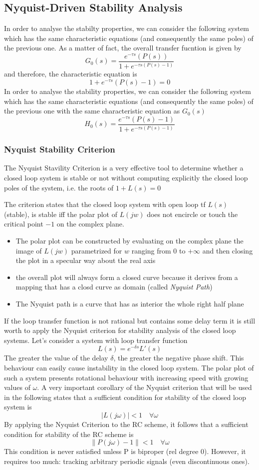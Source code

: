 \documentclass{book}
\begin{document}
\subsection{Nyquist-Driven Stability Analysis}
In order to analyse the stabilty properties, we can consider the following system which has the same characteristic equations (and consequently the same poles) of the previous one. As a matter of fact, the overall transfer fucntion is given by 
\[
    G_0(s) = \displaystyle\frac{e^{-\tau s}(P(s)) }{1+e^{-\tau s(P(s)-1)}}
\]
and therefore, the characteristic equation is 
\[
    1+e^{-\tau s}(P(s)-1)=0
\]
In order to analyse the stability properties, we can consider the following system which has the same characteristic equations (and consequently the same poles) of the previous one
with the same characteristic equation as $G_0(s)$ 
\[
    H_0(s) = \displaystyle\frac{e^{-\tau s}(P(s)-1) }{1+e^{-\tau s(P(s)-1)}}
\]
\subsubsection{Nyquist Stability Criterion} 
The Nyquist Stavility Criterion is a very effective tool to determine whether a closed loop system is stable or not without computing explicitly the closed loop poles of the system, i.e. the roots of $1+L(s)=0$

The criterion states that the closed loop system with open loop tf $L(s)$ (stable), is stable iff the polar plot of $L(jw)$ does not encircle or touch the critical point $-1$ on the complex plane. 
\begin{itemize}
    \item The polar plot can be constructed by evaluating on the complex plane the image of $L(jw)$ parametrized for $w$ ranging from 0 to $+\infty$ and then closing the plot in a specular way about the real axis 
    \item the overall plot will always form a closed curve because it derives from a mapping that has a closd curve as domain (called \emph{Nyquist Path}) 
    \item The Nyquist path is a curve that has as interior the whole right half plane 
\end{itemize}
If the loop transfer function is not rational but contains some delay term it is still worth to apply the Nyquist criterion for stability analysis of the closed loop systems. Let's consider a system with loop transfer function 
\[
    L(s) = e^{-\delta s} L'(s)
\]
The greater the value of the delay $\delta$, the greater the negative phase shift. This behaviour can easily cause instability in the closed loop system. The polar plot of such a system presents rotational behaviour with increasing speed with growing values of $\omega$. A very important corollary of the Nyquist criterion that will be used in the following states that a sufficient condition for stability of the closed loop system is 
\[
    |L(j\omega)|<1 \quad \forall \omega
\]
By applying the Nyquist Criterion to the RC scheme, it follows that a sufficient condition for stability of the RC scheme is 
\[
    \|P(j\omega)-1\| < 1 \quad \forall \omega
\]
This condition is never satisfied unless P is biproper (rel degree 0). However, it requires too much: tracking arbitrary periodic signals (even discontinuous ones).
\end{document}
